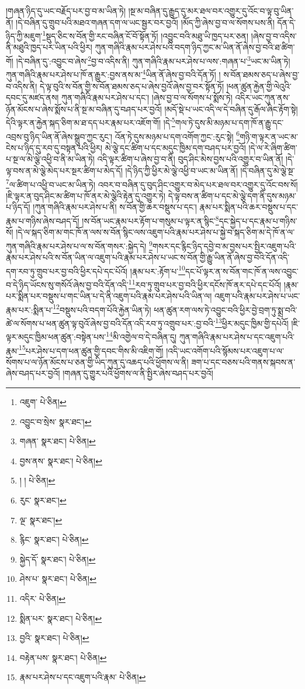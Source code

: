 །གཞན་ཉིད་དུ་ཡང་བརྗོད་པར་བྱ་བ་མ་ཡིན་ཏེ། །སྔ་མ་བཞིན་དུ་རྒྱུད་དུ་མར་ཐལ་བར་འགྱུར་དུ་འོང་བ་ལྟ་བུ་ཡིན་ནོ། །དེ་བཞིན་དུ་གྲུབ་པའི་མཐའ་གཞན་དག་ལ་ཡང་སྦྱར་བར་བྱའོ། །མོད་ཀྱི་ཞེས་བྱ་བ་ལ་སོགས་པས་ནི། དོན་དེ་ཉིད་ཀྱི་མཇུག་\footnote{འཇུག་  པེ་ཅིན། }སྡུད་ཅིང་ས་བོན་གྱི་རང་བཞིན་ངོ་བོ་སྟོན་ཏོ། །འབྱུང་བའི་མཐུ་ཡི་ཁྱད་པར་ཅན། །ཞེས་བྱ་བ་འདིས་ནི་མཐུའི་ཁྱད་པར་ཡིན་པའི་ཕྱིར། ཀུན་གཞིའི་རྣམ་པར་ཤེས་པའི་བདག་ཉིད་ཀྱང་མ་ཡིན་ནོ་ཞེས་བྱ་བའི་ཐ་ཚིག་གོ། །དེ་བཞིན་དུ་:འབྱུང་བ་ཞེས་\footnote{འབྱུང་བ་སྲེས་  སྣར་ཐང་། }བྱ་བ་འདིས་ནི། ཀུན་གཞིའི་རྣམ་པར་ཤེས་པ་ལས་:གཞན་པ་\footnote{གཞན་  སྣར་ཐང་།  པེ་ཅིན། }ཡང་མ་ཡིན་ཏེ། ཀུན་གཞིའི་རྣམ་པར་ཤེས་པ་ཁོ་ན་རྒྱུར་:བྱས་ནས་མ་\footnote{བྱས་ནས་  སྣར་ཐང་།  པེ་ཅིན། }ཡིན་ནོ་ཞེས་བྱ་བའི་དོན་ཏོ། །
ས་བོན་ཐམས་ཅད་པ་ཞེས་བྱ་བ་འདིས་ནི། དེ་ལྟ་བུའི་ས་བོན་གྱི་ས་བོན་ཐམས་ཅད་པ་ཞེས་བྱའོ་ཞེས་བྱ་བར་སྟོན་ཏོ། །ཕན་ཚུན་རྐྱེན་གྱི་ལེའུའི་དབང་དུ་མཛད་ནས། ཀུན་གཞིའི་རྣམ་པར་ཤེས་པ་དང་། །ཞེས་བྱ་བ་ལ་སོགས་པ་སྨོས་ཏེ། འདིར་ཡང་ཀུན་ནས་ཉོན་མོངས་པ་ཞེས་སྨོས་པ་ནི་སྔ་མ་བཞིན་དུ་བཤད་པར་བྱའོ། །མདོ་སྡེ་པ་ཡང་འདི་ལ་དེ་བཞིན་དུ་རྒོལ་ཞིང་རྟོག་སྟེ། དེའི་ལྟར་ན་རྐྱེན་སྐད་ཅིག་མ་ཐ་དད་པར་རྣམ་པར་འཇོག་གོ། །དེ་\footnote{། །  པེ་ཅིན། }གལ་ཏེ་དུས་མི་མཉམ་པ་དག་ཁོ་ན་རྒྱུ་དང་འབྲས་བུ་ཉིད་ཡིན་ནོ་ཞེས་སྒྲུབ་ཀྱང་རུང་། འོན་ཏེ་དུས་མཉམ་པ་དག་འགོག་ཀྱང་:རུང་སྟེ། \footnote{རུང་  སྣར་ཐང་། }གཉི་ག་ལྟར་ན་ཡང་མ་ངེས་པ་ཉིད་དུ་རབ་དུ་བསྟན་པའི་ཕྱིར། མེ་ལྕེ་དང་ཚིག་པ་དང་མདུང་ཁྱིམ་དག་བཤད་པར་བྱའོ། །དེ་ལ་རེ་ཞིག་ཚིག་པ་སྔ་ལ་མེ་ལྕེ་འཕྱི་བ་ནི་མ་ཡིན་ཏེ། འདི་ལྟར་ཚིག་པ་ཞེས་བྱ་བ་ནི། བུད་ཤིང་མེས་བྱས་པའི་འགྱུར་བ་ཡིན་ནོ། །དེ་ལྟ་བས་ན་མེ་ལྕེ་མེད་པར་སྔར་ཚིག་པ་མེད་དོ། །དེ་ཉིད་ཀྱི་ཕྱིར་མེ་ལྕེ་འཕྱི་བ་ཡང་མ་ཡིན་ནོ། །དེ་བཞིན་དུ་མེ་ལྕེ་སྔ་\footnote{ལྔ་  སྣར་ཐང་། }ལ་ཚིག་པ་འཕྱི་བ་ཡང་མ་ཡིན་ཏེ། འབར་བ་བཞིན་དུ་བུད་ཤིང་འགྱུར་བ་མེད་པར་ཐལ་བར་འགྱུར་དུ་འོང་བས་སོ། །ཇི་ལྟར་ན་བུད་ཤིང་མ་ཚིག་པ་ཁོ་ནར་མེ་ལྕེའི་རྟེན་དུ་འགྱུར་ཏེ། དེ་ལྟ་བས་ན་ཚིག་པ་དང་མེ་ལྕེ་དག་ནི་དུས་མཉམ་པ་ཉིད་དོ། །ཀུན་གཞིའི་རྣམ་པར་ཤེས་པ་ནི། ས་བོན་གྱི་ཆར་བསྡུས་པ་དང་། རྣམ་པར་སྨིན་པའི་ཆར་བསྡུས་པ་དང་རྣམ་པ་གཉིས་ཞེས་བཤད་དོ། །ས་བོན་ཡང་རྣམ་པར་རྟོག་པ་གསུམ་པ་ལྟར་ན་སྙིང་\footnote{རྙིང་  སྣར་ཐང་།  པེ་ཅིན། }དང་སྐྱེད་པ་དང་རྣམ་པ་གཉིས་སོ། །དེ་ལ་སྐད་ཅིག་མ་གང་ཁོ་ན་ལས་ས་བོན་སྙིང་ལས་འཇུག་པའི་རྣམ་པར་ཤེས་པ་སྐྱེ་བ་སྐད་ཅིག་མ་དེ་ཁོ་ན་ལ་ཀུན་གཞིའི་རྣམ་པར་ཤེས་པ་ལ་ས་བོན་གསར་:སྐྱེད་དེ། \footnote{སྐྱེད་དོ་  སྣར་ཐང་།  པེ་ཅིན། }གསར་དང་རྙིང་ཉིད་དབྱེ་བ་མ་བྱས་པར་སྤྱིར་འཇུག་པའི་རྣམ་པར་ཤེས་པའི་ས་བོན་ཡིན་ལ་འཇུག་པའི་རྣམ་པར་ཤེས་པ་ཡང་ས་བོན་གྱི་རྒྱུ་ཡིན་ནོ་ཞེས་བྱ་བའི་དོན་འདི་དག་རབ་ཏུ་གྲུབ་པར་བྱ་བའི་ཕྱིར་དཔེ་དང་པོའོ། །རྣམ་པར་:རྟོག་པ་\footnote{ཤེས་པ་  སྣར་ཐང་།  པེ་ཅིན། }དང་པོ་ལྟར་ན་ས་བོན་གང་ཁོ་ན་ལས་འབྱུང་བ་དེ་ཉིད་ཡོངས་སུ་གསོའོ་ཞེས་བྱ་བའི་དོན་འདི་\footnote{འདིར་  པེ་ཅིན། }རབ་ཏུ་གྲུབ་པར་བྱ་བའི་ཕྱིར་དངོས་ཁོ་ནར་དཔེ་དང་པོའོ། །རྣམ་པར་སྨིན་པར་བསྡུས་པ་གང་ཡིན་པ་དེ་ནི་འཇུག་པའི་རྣམ་པར་ཤེས་པའི་ཡིན་ལ། འཇུག་པའི་རྣམ་པར་ཤེས་པ་ཡང་རྣམ་པར་:སྨིན་པ་\footnote{སྨིན་པར་  སྣར་ཐང་།  པེ་ཅིན། }བསྡུས་པའི་བདག་པོའི་རྐྱེན་ཡིན་ཏེ། ཕན་ཚུན་རག་ལས་ཏེ་འབྱུང་བའི་ཕྱིར་བྱེ་བྲག་ཏུ་སྨྲ་བའི་ཚེ་ལ་སོགས་པ་ཕན་ཚུན་ལྟ་བུའོ་ཞེས་བྱ་བའི་དོན་འདི་རབ་ཏུ་འགྲུབ་པར་:བྱ་བའི་\footnote{བྱའི་  སྣར་ཐང་།  པེ་ཅིན། }ཕྱིར་མདུང་ཁྱིམ་གྱི་དཔེའོ། །ཇི་ལྟར་མདུང་ཁྱིམ་ཕན་ཚུན་:བསྟེན་པས་\footnote{བརྟེན་པས་  སྣར་ཐང་།  པེ་ཅིན། }མི་འགྱེལ་བ་དེ་བཞིན་དུ། ཀུན་གཞིའི་རྣམ་པར་ཤེས་པ་དང་འཇུག་པའི་རྣམ་\footnote{རྣམ་པར་ཤེས་པ་དང་འཇུག་པའི་རྣམ་  པེ་ཅིན། }པར་ཤེས་པ་དག་ཕན་ཚུན་གྱི་དབང་གིས་མི་འཇིག་གོ། །འདི་ཡང་འགོག་པའི་སྙོམས་པར་འཇུག་པ་ལ་སོགས་པ་ལ་ཉོན་མོངས་པ་ཅན་གྱི་ཡིད་ཀུན་དུ་འཆད་པའི་ཕྱོགས་ལ་ནི། ཟག་པ་དང་བཅས་པའི་གནས་སྐབས་ན་ཞེས་བཤད་པར་བྱའོ། །གཞན་དུ་གྱུར་པའི་ཕྱོགས་ལ་ནི་སྤྱིར་ཞེས་བཤད་པར་བྱའོ། 